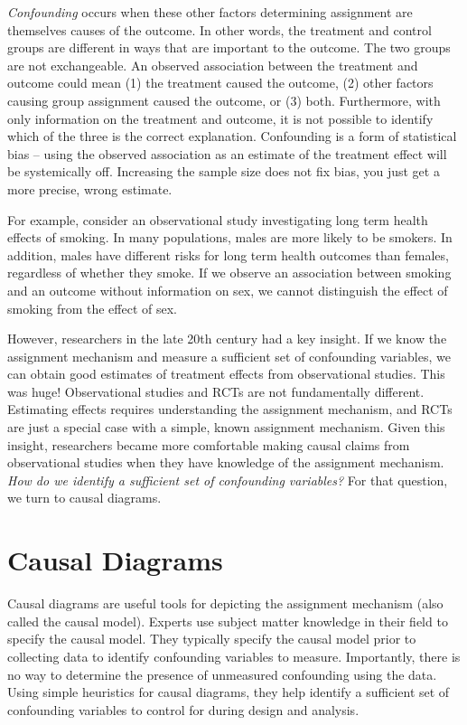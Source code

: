 \documentclass[
]{book}
\begin{document}
\emph{Confounding} occurs when these other factors determining assignment are themselves causes of the outcome. In other words, the treatment and control groups are different in ways that are important to the outcome. The two groups are not exchangeable. An observed association between the treatment and outcome could mean (1) the treatment caused the outcome, (2) other factors causing group assignment caused the outcome, or (3) both. Furthermore, with only information on the treatment and outcome, it is not possible to identify which of the three is the correct explanation. Confounding is a form of statistical bias -- using the observed association as an estimate of the treatment effect will be systemically off. Increasing the sample size does not fix bias, you just get a more precise, wrong estimate.

For example, consider an observational study investigating long term health effects of smoking. In many populations, males are more likely to be smokers. In addition, males have different risks for long term health outcomes than females, regardless of whether they smoke. If we observe an association between smoking and an outcome without information on sex, we cannot distinguish the effect of smoking from the effect of sex.

However, researchers in the late 20th century had a key insight. If we know the assignment mechanism and measure a sufficient set of confounding variables, we can obtain good estimates of treatment effects from observational studies. This was huge! Observational studies and RCTs are not fundamentally different. Estimating effects requires understanding the assignment mechanism, and RCTs are just a special case with a simple, known assignment mechanism. Given this insight, researchers became more comfortable making causal claims from observational studies when they have knowledge of the assignment mechanism. \emph{How do we identify a sufficient set of confounding variables?} For that question, we turn to causal diagrams.

\hypertarget{causal-diagrams}{%
\section{Causal Diagrams}\label{causal-diagrams}}

Causal diagrams are useful tools for depicting the assignment mechanism (also called the causal model). Experts use subject matter knowledge in their field to specify the causal model. They typically specify the causal model prior to collecting data to identify confounding variables to measure. Importantly, there is no way to determine the presence of unmeasured confounding using the data. Using simple heuristics for causal diagrams, they help identify a sufficient set of confounding variables to control for during design and analysis.
\end{document}
